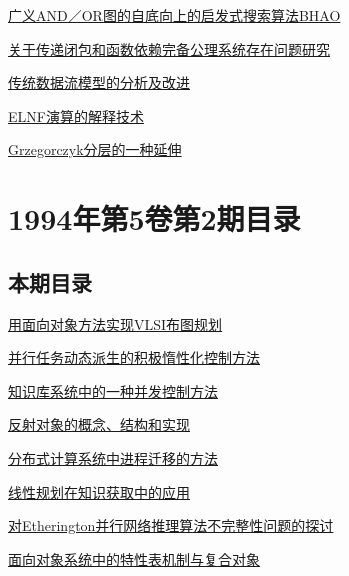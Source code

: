 \documentclass[a4paper]{article}
\begin{document}
\href{http://www.jos.org.cn/ch/reader/download_pdf.aspx?file_no=19940304&year_id=1994&quarter_id=3&falg=1}{广义AND／OR图的自底向上的启发式搜索算法BHAO}

\href{http://www.jos.org.cn/ch/reader/download_pdf.aspx?file_no=19940305&year_id=1994&quarter_id=3&falg=1}{关于传递闭包和函数依赖完备公理系统存在问题研究}

\href{http://www.jos.org.cn/ch/reader/download_pdf.aspx?file_no=19940306&year_id=1994&quarter_id=3&falg=1}{传统数据流模型的分析及改进}

\href{http://www.jos.org.cn/ch/reader/download_pdf.aspx?file_no=19940307&year_id=1994&quarter_id=3&falg=1}{ELNF演算的解释技术}

\href{http://www.jos.org.cn/ch/reader/download_pdf.aspx?file_no=19940308&year_id=1994&quarter_id=3&falg=1}{Grzegorczyk分层的一种延伸}


\section{\textbf{1994年第5卷第2期目录}}
\subsection{本期目录}
\href{http://www.jos.org.cn/ch/reader/download_pdf.aspx?file_no=19940201&year_id=1994&quarter_id=2&falg=1}{用面向对象方法实现VLSI布图规划}

\href{http://www.jos.org.cn/ch/reader/download_pdf.aspx?file_no=19940202&year_id=1994&quarter_id=2&falg=1}{并行任务动态派生的积极惰性化控制方法}

\href{http://www.jos.org.cn/ch/reader/download_pdf.aspx?file_no=19940203&year_id=1994&quarter_id=2&falg=1}{知识库系统中的一种并发控制方法}

\href{http://www.jos.org.cn/ch/reader/download_pdf.aspx?file_no=19940204&year_id=1994&quarter_id=2&falg=1}{反射对象的概念、结构和实现}

\href{http://www.jos.org.cn/ch/reader/download_pdf.aspx?file_no=19940205&year_id=1994&quarter_id=2&falg=1}{分布式计算系统中进程迁移的方法}

\href{http://www.jos.org.cn/ch/reader/download_pdf.aspx?file_no=19940206&year_id=1994&quarter_id=2&falg=1}{线性规划在知识获取中的应用}

\href{http://www.jos.org.cn/ch/reader/download_pdf.aspx?file_no=19940207&year_id=1994&quarter_id=2&falg=1}{对Etherington并行网络推理算法不完整性问题的探讨}

\href{http://www.jos.org.cn/ch/reader/download_pdf.aspx?file_no=19940208&year_id=1994&quarter_id=2&falg=1}{面向对象系统中的特性表机制与复合对象}
\end{document}
